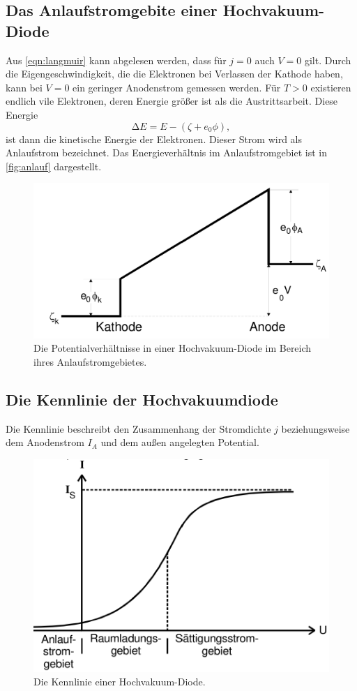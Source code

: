 \subsection{Das Anlaufstromgebite einer Hochvakuum-Diode}
\label{sec:Das Anlaufstromgebite einer Hochvakuum-Diode}

Aus \autoref{eqn:langmuir} kann abgelesen werden, dass für $j = 0$ auch $V = 0$ gilt.
Durch die Eigengeschwindigkeit, die die Elektronen bei Verlassen der Kathode haben, kann bei $V = 0$
ein geringer Anodenstrom gemessen werden. Für $T > 0$ existieren endlich vile Elektronen, deren Energie größer ist 
als die Austrittsarbeit. Diese Energie 
\begin{equation}
    \increment E = E - \left(\zeta + e_0\phi\right),
\end{equation}    
ist dann die kinetische Energie der Elektronen. Dieser Strom wird als Anlaufstrom bezeichnet.
Das Energieverhältnis im Anlaufstromgebiet ist in \autoref{fig:anlauf} dargestellt.

\begin{figure}[H]
    \centering
    \includegraphics[width=0.5\linewidth]{content/grafik/anlauf.png}
    \caption{Die Potentialverhältnisse in einer Hochvakuum-Diode im Bereich ihres Anlaufstromgebietes.\cite{elektron}}
    \label{fig:anlauf}
\end{figure}

\subsection{Die Kennlinie der Hochvakuumdiode}
\label{sec:Die Kennlinie der Hochvakuumdiode}

Die Kennlinie beschreibt den Zusammenhang der Stromdichte $j$ beziehungsweise dem Anodenstrom $I_A$ 
und dem außen angelegten Potential.

\begin{figure}[H]
    \centering
    \includegraphics[width=0.5\linewidth]{content/grafik/kennlinie.png}
    \caption{Die Kennlinie einer Hochvakuum-Diode.\cite{elektron}}
    \label{fig:kennlinie}
\end{figure}

